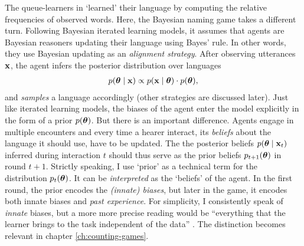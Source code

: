 \documentclass{../src/bcthesispart}
\begin{document}
The queue-learners in \textcite{DeVylder2006} ‘learned’ their language by computing the relative frequencies of observed words.
Here, the Bayesian naming game takes a different turn.
Following Bayesian iterated learning models, it assumes that agents are Bayesian reasoners updating their language using Bayes’ rule.
In other words, they use Bayesian updating as an \emph{alignment strategy}.
After observing utterances $\boldsymbol{\mathbf{x}}$, the agent infers the posterior distribution over languages
\begin{align}
	\label{eq:ch4:bayesian-inference}
	p(\boldsymbol{\mathbf{\theta}} \mid \boldsymbol{\mathbf{x}}) 
		\propto 
			p(\boldsymbol{\mathbf{x}} \mid \boldsymbol{\mathbf{\boldsymbol{\mathbf{\theta}}}}) 
			\cdot p(\boldsymbol{\mathbf{\theta}}),
\end{align}
and \emph{samples} a language accordingly (other strategies are discussed later).
Just like iterated learning models, the biases of the agent enter the model explicitly in the form of a prior $p(\boldsymbol{\mathbf{\theta}})$. 
But there is an important difference.
Agents engage in multiple encounters and every time a hearer interact, its \emph{beliefs} about the language it should use, have to be updated.
The the posterior beliefs $p(\boldsymbol{\mathbf{\theta}} \mid \boldsymbol{\mathbf{x}}_t)$ inferred during interaction $t$ should thus serve as the prior beliefs $p_{t+1}(\boldsymbol{\mathbf{\theta}})$ in round $t+1$.
Strictly speaking, I use ‘prior’ as a technical term for the distribution $p_t(\boldsymbol{\mathbf{\theta}})$.
It can be \emph{interpreted} as the ‘beliefs’ of the agent.
In the first round, the prior encodes the \emph{(innate) biases}, but later in the game, it encodes both innate biases and \emph{past experience}.
For simplicity, I consistently speak of \emph{innate} biases, but a more more precise reading would be “everything that the learner brings to the task independent of the data” \parencite{Kirby2004}. The distinction becomes relevant in chapter \ref{ch:counting-games}.
\end{document}

